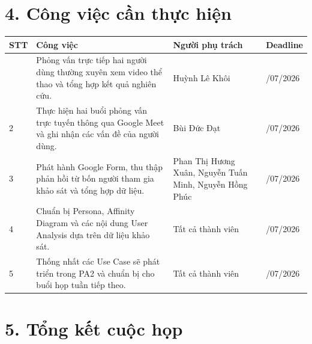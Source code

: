 \documentclass[11pt,a4paper]{article}
\begin{document}

\section*{4. Công việc cần thực hiện}

\begin{tabularx}{\textwidth}{|>{\centering\arraybackslash}p{0.8cm}|X|>{\centering\arraybackslash}p{4.5cm}|>{\centering\arraybackslash}p{2.2cm}|}
\hline
\rowcolor{gray!20}
\textbf{STT} &
\textbf{Công việc} &
\textbf{Người phụ trách} &
\textbf{Deadline}\\
\hline

1 &
Phỏng vấn trực tiếp hai người dùng thường xuyên xem video thể thao và tổng hợp kết quả nghiên cứu. &
Huỳnh Lê Khôi &
14/07/2026\\
\hline

2 &
Thực hiện hai buổi phỏng vấn trực tuyến thông qua Google Meet và ghi nhận các vấn đề của người dùng. &
Bùi Đức Đạt &
14/07/2026\\
\hline

3 &
Phát hành Google Form, thu thập phản hồi từ bốn người tham gia khảo sát và tổng hợp dữ liệu. &
Phan Thị Hương Xuân, Nguyễn Tuấn Minh, Nguyễn Hồng Phúc &
15/07/2026\\
\hline

4 &
Chuẩn bị Persona, Affinity Diagram và các nội dung User Analysis dựa trên dữ liệu khảo sát. &
Tất cả thành viên &
16/07/2026\\
\hline

5 &
Thống nhất các Use Case sẽ phát triển trong PA2 và chuẩn bị cho buổi họp tuần tiếp theo. &
Tất cả thành viên &
16/07/2026\\
\hline

\end{tabularx}

\vspace{0.8cm}


\section*{5. Tổng kết cuộc họp}
\end{document}
